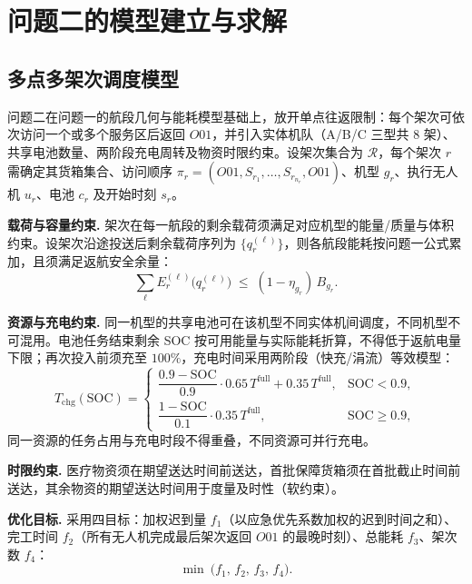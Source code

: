 \section{问题二的模型建立与求解}

\subsection{多点多架次调度模型}

问题二在问题一的航段几何与能耗模型基础上，放开单点往返限制：每个架次可依次访问一个或多个服务区后返回 $O01$，并引入实体机队（A/B/C 三型共 8 架）、共享电池数量、两阶段充电周转及物资时限约束。设架次集合为 $\mathcal{R}$，每个架次 $r$ 需确定其货箱集合、访问顺序 $\pi_r=(O01,S_{r_1},\dots,S_{r_{n_r}},O01)$、机型 $g_r$、执行无人机 $u_r$、电池 $c_r$ 及开始时刻 $s_r$。

\textbf{载荷与容量约束.} 架次在每一航段的剩余载荷须满足对应机型的能量/质量与体积约束。设架次沿途投送后剩余载荷序列为 $\{q_r^{(\ell)}\}$，则各航段能耗按问题一公式累加，且须满足返航安全余量：
\begin{equation}
\sum_{\ell} E^{(\ell)}_r\big(q_r^{(\ell)}\big)\;\le\;(1-\eta_{g_r})\,B_{g_r}.
\end{equation}

\textbf{资源与充电约束.} 同一机型的共享电池可在该机型不同实体机间调度，不同机型不可混用。电池任务结束剩余 SOC 按可用能量与实际能耗折算，不得低于返航电量下限；再次投入前须充至 $100\%$，充电时间采用两阶段（快充/涓流）等效模型\cite{ref_ti}：
\begin{equation}
T_{\text{chg}}(\text{SOC})=
\begin{cases}
\dfrac{0.9-\text{SOC}}{0.9}\cdot 0.65\,T^{\text{full}}+0.35\,T^{\text{full}}, & \text{SOC}<0.9,\\[2mm]
\dfrac{1-\text{SOC}}{0.1}\cdot 0.35\,T^{\text{full}}, & \text{SOC}\ge 0.9,
\end{cases}
\end{equation}
同一资源的任务占用与充电时段不得重叠，不同资源可并行充电。

\textbf{时限约束.} 医疗物资须在期望送达时间前送达，首批保障货箱须在首批截止时间前送达，其余物资的期望送达时间用于度量及时性（软约束）。

\textbf{优化目标.} 采用四目标：加权迟到量 $f_1$（以应急优先系数加权的迟到时间之和）、完工时间 $f_2$（所有无人机完成最后架次返回 $O01$ 的最晚时刻）、总能耗 $f_3$、架次数 $f_4$：
\begin{equation}
\min\ \big(f_1,\,f_2,\,f_3,\,f_4\big).
\end{equation}

